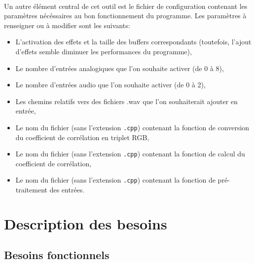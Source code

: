 \documentclass{article}
\begin{document}
\paragraph{}
Un autre élément central de cet outil est le fichier de configuration
contenant les paramètres nécéssaires au bon fonctionnement du programme. Les
paramètres à renseigner ou à modifier sont les suivants:
\begin{itemize}
 \item L'activation des effets et la taille des buffers correspondants
       (toutefois, l'ajout d'effets semble diminuer les performances du
       programme),
 \item Le nombre d'entrées analogiques que l'on souhaite activer (de 0 à 8),
 \item Le nombre d'entrées audio que l'on souhaite activer (de 0 à 2),
 \item Les chemins relatifs vers des fichiers .wav que l'on souhaiterait
       ajouter en entrée,
 \item Le nom du fichier (sans l'extension \verb!.cpp!) contenant la
       fonction de conversion du coefficient de corrélation en triplet RGB,
 \item Le nom du fichier (sans l'extension \verb!.cpp!) contenant la
       fonction de calcul du coefficient de corrélation,
 \item Le nom du fichier (sans l'extension \verb!.cpp!) contenant la
       fonction de pré-traitement des entrées.
\end{itemize}
\section{Description des besoins}
\subsection{Besoins fonctionnels}
\end{document}
